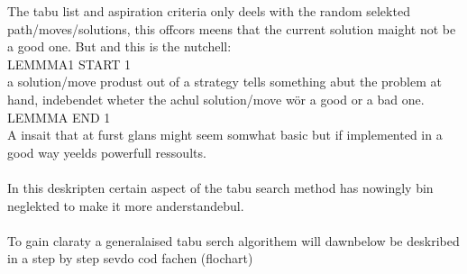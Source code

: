 The tabu list and aspiration criteria only deels with the random selekted path/moves/solutions, this offcors meens that the current solution maight not be a good one. But and this is the nutchell:\\ 
LEMMMA1 START 1\\
a solution/move produst out of a strategy tells something abut the problem at hand, indebendet wheter the achul solution/move wör a good or a bad one.\\
LEMMMA END 1\\
A insait that at furst glans might seem somwhat basic but if implemented in a good way yeelds powerfull ressoults.\\
\\
In this deskripten certain aspect of the tabu search method has nowingly bin neglekted to make it more anderstandebul.\\
\\
To gain claraty a generalaised tabu serch algorithem will dawnbelow be deskribed in a step by step sevdo cod fachen (flochart)\\

